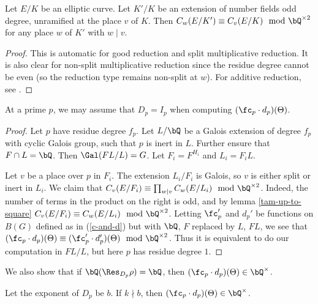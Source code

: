 \begin{lemma}\label{tam-up-to-square}
    Let $E / K$ be an elliptic curve. Let $K' / K$ be an extension of number fields odd degree, unramified at the place $v$ of $K$. Then $C_w(E / K') \equiv C_v(E / K) \mod \bQ^{\times 2}$ for any place $w$ of $K'$ with $ w \mid v$. 
\end{lemma}

\begin{proof}
This is automatic for good reduction and split multiplicative reduction. It is also clear for non-split multiplicative reduction since the residue degree cannot be even (so the reduction type remains non-split at $w$). For additive reduction, see \cite[Lemma 3.12]{reg-const}.
\end{proof}

\begin{lemma}\label{DeqI}
    At a prime $p$, we may assume that $D_p = I_p$ when computing $(\fc_p \cdot d_p)(\Theta)$. 
\end{lemma}

\begin{proof}
Let $p$ have residue degree $f_p$. Let $L / \bQ$ be a Galois extension of degree $f_p$ with cyclic Galois group, such that $p$ is inert in $L$. Further ensure that $F \cap L = \bQ$. Then $\Gal(FL / L) = G$. Let $F_i = F^{H_i}$ and $L_i = F_i L$.

Let $v$ be a place over $p$ in $F_i$. The extension $L_i / F_i$ is Galois, so $v$ is either split or inert in $L_i$.
We claim that $C_v(E / F_i) \equiv \prod_{w | v} C_w(E / L_i) \mod \bQ^{\times 2}$. Indeed, the number of terms in the product on the right is odd, and by lemma \ref{tam-up-to-square} $C_v(E / F_i) \equiv C_w(E / L_i) \mod \bQ^{\times 2}$. 
Letting $\fc_p'$ and $d_p'$ be functions on $B(G)$ defined as in (\ref{c-and-d}) but with $\bQ$, $F$ replaced by $L$, $FL$, we see that $(\fc_p \cdot d_p)(\Theta) \equiv (\fc_p' \cdot d_p')(\Theta) \mod \bQ^{\times 2}$. 
Thus it is equivalent to do our computation in $FL / L$, but here $p$ has residue degree $1$.
\end{proof}

We also show that if $\bQ(\Res_{D_p} \rho) = \bQ$, then $(\fc_p \cdot d_p)(\Theta) \in \bQ^{\times}$.

\begin{lemma}\label{rational-res}
    Let the exponent of $D_p$ be $b$. If $k \nmid b$, then $(\fc_p \cdot d_p)(\Theta) \in \bQ^{\times}$. 
\end{lemma}

